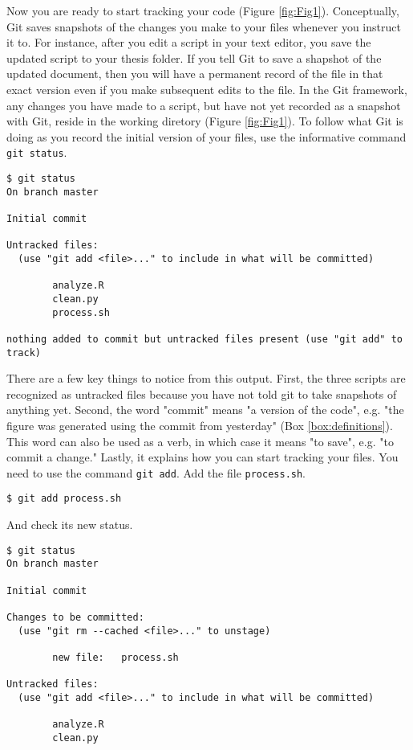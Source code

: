 Now you are ready to start tracking your code (Figure \ref{fig:Fig1}).
Conceptually, Git saves snapshots of the changes you make to your files whenever you instruct it to.
For instance, after you edit a script in your text editor, you save the updated script to your thesis folder.
If you tell Git to save a shapshot of the updated document, then you will have a permanent record of the file in that exact version even if you make subsequent edits to the file.
In the Git framework, any changes you have made to a script, but have not yet recorded as a snapshot with Git, reside in the working diretory (Figure \ref{fig:Fig1}).
To follow what Git is doing as you record the initial version of your files, use the informative command \verb|git status|.

\begin{lstlisting}
$ git status
On branch master

Initial commit

Untracked files:
  (use "git add <file>..." to include in what will be committed)

        analyze.R
        clean.py
        process.sh

nothing added to commit but untracked files present (use "git add" to track)
\end{lstlisting}

There are a few key things to notice from this output.
First, the three scripts are recognized as untracked files because you have not told git to take snapshots of anything yet.
Second, the word "commit" means "a version of the code", e.g. "the figure was generated using the commit from yesterday" (Box \ref{box:definitions}).
This word can also be used as a verb, in which case it means "to save", e.g. "to commit a change."
Lastly, it explains how you can start tracking your files.
You need to use the command \verb|git add|.
Add the file \verb|process.sh|.

\begin{lstlisting}
$ git add process.sh
\end{lstlisting}

And check its new status.

\begin{lstlisting}
$ git status
On branch master

Initial commit

Changes to be committed:
  (use "git rm --cached <file>..." to unstage)

        new file:   process.sh

Untracked files:
  (use "git add <file>..." to include in what will be committed)

        analyze.R
        clean.py
\end{lstlisting}

